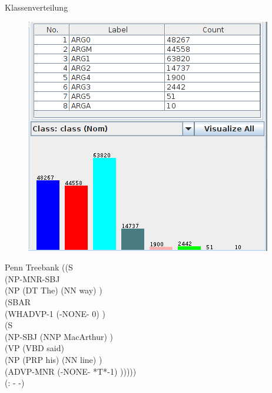 \documentclass[10pt]{beamer}
\begin{document}
\begin{frame}{Klassenverteilung}
	\begin{figure}
		\begin{centering}
			\includegraphics[scale=0.5]{class}
		\end{centering}
	\end{figure}
\end{frame}

\begin{frame}{Penn Treebank}
((S \\
\hspace{10pt}   (NP-MNR-SBJ \\
\hspace{25pt}   (NP (DT The) (NN way) ) \\
\hspace{25pt} (SBAR \\
\hspace{40pt}  (WHADVP-1 (-NONE- 0) )\\
\hspace{40pt}   (S \\
\hspace{60pt}      (NP-SBJ (NNP MacArthur) )\\
\hspace{60pt}    (VP (VBD said) \\
\hspace{80pt}       (NP (PRP his) (NN line) )\\
\hspace{80pt}      (ADVP-MNR (-NONE- *T*-1) )))))\\
 (: - -) \\
    

\end{frame}
\end{document}
